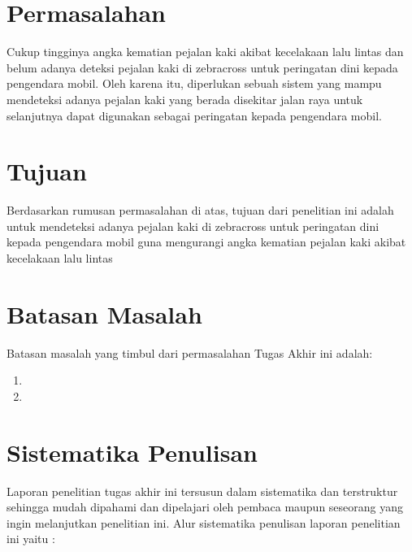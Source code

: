 \section{Permasalahan}
\label{sec:permasalahan}

Cukup tingginya angka kematian pejalan kaki akibat kecelakaan lalu lintas dan belum adanya deteksi pejalan kaki di zebracross untuk peringatan dini kepada pengendara mobil. Oleh karena itu, diperlukan sebuah sistem yang mampu mendeteksi adanya pejalan kaki yang berada disekitar jalan raya untuk selanjutnya dapat digunakan sebagai peringatan kepada pengendara mobil.

\section{Tujuan}
\label{sec:Tujuan}

Berdasarkan rumusan permasalahan di atas, tujuan dari penelitian ini adalah untuk mendeteksi adanya pejalan kaki di zebracross untuk peringatan dini kepada pengendara mobil guna mengurangi angka kematian pejalan kaki akibat kecelakaan lalu lintas

\section{Batasan Masalah}
\label{sec:batasanmasalah}

Batasan masalah yang timbul dari permasalahan Tugas Akhir ini adalah:

\begin{enumerate}[nolistsep]

  \item 

  \item 

\end{enumerate}

\section{Sistematika Penulisan}
\label{sec:sistematikapenulisan}

Laporan penelitian tugas akhir ini tersusun dalam sistematika dan terstruktur sehingga mudah dipahami dan dipelajari oleh pembaca maupun seseorang yang ingin melanjutkan penelitian ini. Alur sistematika penulisan laporan penelitian ini yaitu :

